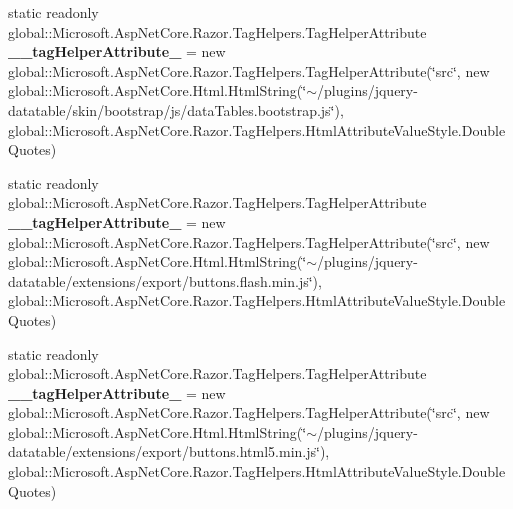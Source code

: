 \begin{DoxyCompactItemize}
\item 
\mbox{\label{class_asp_net_core_1_1_views___volunteers___index_aab7ef785c4f4714904ce53fba9aec2d9}} 
static readonly global\+::\+Microsoft.\+Asp\+Net\+Core.\+Razor.\+Tag\+Helpers.\+Tag\+Helper\+Attribute {\bfseries \+\_\+\+\_\+tag\+Helper\+Attribute\+\_} = new global\+::\+Microsoft.\+Asp\+Net\+Core.\+Razor.\+Tag\+Helpers.\+Tag\+Helper\+Attribute(\char`\"{}src\char`\"{}, new global\+::\+Microsoft.\+Asp\+Net\+Core.\+Html.\+Html\+String(\char`\"{}$\sim$/plugins/jquery-\/datatable/skin/bootstrap/js/data\+Tables.\+bootstrap.\+js\char`\"{}), global\+::\+Microsoft.\+Asp\+Net\+Core.\+Razor.\+Tag\+Helpers.\+Html\+Attribute\+Value\+Style.\+Double\+Quotes)
\item 
\mbox{\label{class_asp_net_core_1_1_views___volunteers___index_a1c658ae70e10db8e7776bfcad3d8797c}} 
static readonly global\+::\+Microsoft.\+Asp\+Net\+Core.\+Razor.\+Tag\+Helpers.\+Tag\+Helper\+Attribute {\bfseries \+\_\+\+\_\+tag\+Helper\+Attribute\+\_} = new global\+::\+Microsoft.\+Asp\+Net\+Core.\+Razor.\+Tag\+Helpers.\+Tag\+Helper\+Attribute(\char`\"{}src\char`\"{}, new global\+::\+Microsoft.\+Asp\+Net\+Core.\+Html.\+Html\+String(\char`\"{}$\sim$/plugins/jquery-\/datatable/extensions/export/buttons.\+flash.\+min.\+js\char`\"{}), global\+::\+Microsoft.\+Asp\+Net\+Core.\+Razor.\+Tag\+Helpers.\+Html\+Attribute\+Value\+Style.\+Double\+Quotes)
\item 
\mbox{\label{class_asp_net_core_1_1_views___volunteers___index_a4af8832c21cb0a3b64a6723ebcf6522a}} 
static readonly global\+::\+Microsoft.\+Asp\+Net\+Core.\+Razor.\+Tag\+Helpers.\+Tag\+Helper\+Attribute {\bfseries \+\_\+\+\_\+tag\+Helper\+Attribute\+\_} = new global\+::\+Microsoft.\+Asp\+Net\+Core.\+Razor.\+Tag\+Helpers.\+Tag\+Helper\+Attribute(\char`\"{}src\char`\"{}, new global\+::\+Microsoft.\+Asp\+Net\+Core.\+Html.\+Html\+String(\char`\"{}$\sim$/plugins/jquery-\/datatable/extensions/export/buttons.\+html5.\+min.\+js\char`\"{}), global\+::\+Microsoft.\+Asp\+Net\+Core.\+Razor.\+Tag\+Helpers.\+Html\+Attribute\+Value\+Style.\+Double\+Quotes)
\item 
\mbox{\label{class_asp_net_core_1_1_views___volunteers___index_ac09b0c4857b704c8275064bfd5c55e42}} 

\end{DoxyCompactItemize}
